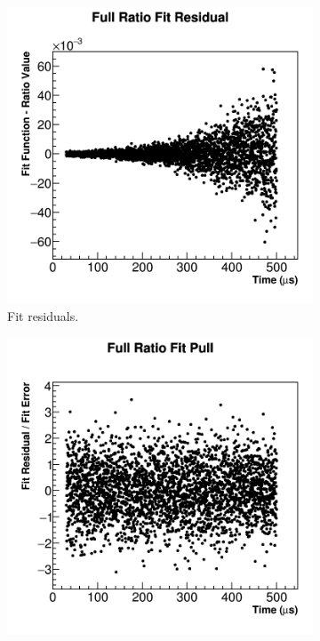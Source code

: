 \begin{figure}[H]
\centering
    \begin{subfigure}[]{0.45\textwidth}
	    \centering
		\includegraphics[width=\textwidth]{fitResidual}
	    \caption{Fit residuals.}
    \end{subfigure}
    \begin{subfigure}[]{0.45\textwidth}
	    \centering
		\includegraphics[width=\textwidth]{fitPull}

\end{subfigure}
\end{figure}
